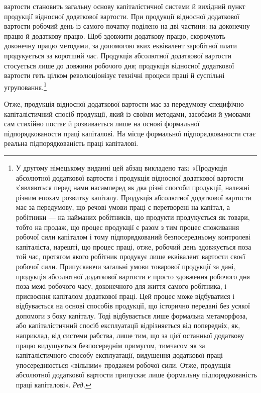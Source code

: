 \parcont{}  %
вартости становить загальну основу капіталістичної системи
й вихідний пункт продукції відносної додаткової вартости. При
продукції відносної додаткової вартости робочий день із самого
початку поділено на дві частини: на доконечну працю й додаткову
працю. Щоб здовжити додаткову працю, скорочують доконечну
працю методами, за допомогою яких еквівалент заробітної
плати продукується за коротший час. Продукція абсолютної
додаткової вартости стосується лише до довжини робочого дня;
продукція відносної додаткової вартости геть цілком революціонізує
технічні процеси праці й суспільні угруповання.\footnote*{
У другому німецькому виданні цей абзац викладено так: «Продукція
абсолютної додаткової вартости і продукція відносної додаткової
вартости з’являються перед нами насамперед як два різні способи продукції,
належні різним епохам розвитку капіталу. Продукція абсолютної
додаткової вартости має за передумову, що речові умови праці є перетворені
на капітал, а робітники — на найманих робітників, що продукти
продукується як товари, тобто на продаж, що процес продукції є разом
з тим процес споживання робочої сили капіталом і тому підпорядкований
безпосередньому контролеві капіталіста, нарешті, що процес праці, отже,
робочий день здовжується поза той час, протягом якого робітник продукує
лише еквівалент вартости своєї робочої сили. Припускаючи загальні
умови товарової продукції за дані, продукція абсолютної додаткової вартости
є просто здовження робочого дня поза межі робочого часу, доконечного
для життя самого робітника, і присвоєння капіталом додаткової
праці. Цей процес може відбуватися і відбувається на основі способів
продукції, що історично передані без усякої допомоги з боку капіталу.
Тоді відбувається лише формальна метаморфоза, або капіталістичний
спосіб експлуатації відрізняється від попередніх, як, наприклад, від
системи рабства, лише тим, що за цієї останньої додаткову працю видушується
безпосереднім примусом, тимчасом як за капіталістичного способу
експлуатації, видушення додаткової праці упосереднюється «вільним»
продажем робочої сили. Отже, продукція абсолютної додаткової
вартости припускає лише формальну підпорядкованість праці капіталові». \emph{Ред.}
}

Отже, продукція відносної додаткової вартости має за передумову
специфічно капіталістичний спосіб продукції, який із
своїми методами, засобами й умовами сам стихійно постає й розвивається
лише на основі формальної підпорядкованости праці
капіталові. На місце формальної підпорядкованости стає реальна
підпорядкованість праці капіталові.


